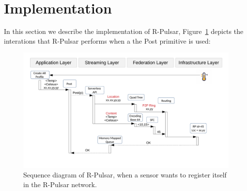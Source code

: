 
\section{Implementation}

In this section we describe the implementation of R-Pulsar, Figure~\ref{fig:diagram} depicts the interations that R-Pulsar performs when a the Post primitive is used:

\begin{figure}[htb!]
  \centering
  \hspace*{-2cm}   
    \includegraphics[width=1\textwidth]{Figures/Diagram.pdf}
  \caption{Sequence diagram of R-Pulsar, when a sensor wants to register itself in the R-Pulsar network.} \label{fig:diagram}
\end{figure}


